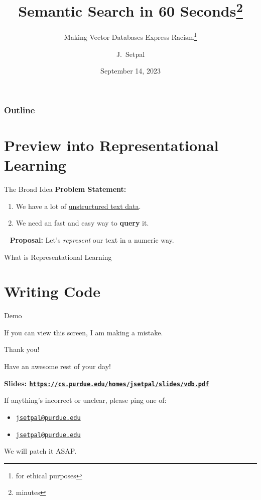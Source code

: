 \documentclass{beamer}
\title{Semantic Search in 60 Seconds\thanks{minutes}}
\subtitle{Making Vector Databases Express Racism\thanks{for ethical purposes}}
\author[ML@Purdue x Purdue Hackers] %
{J.~Setpal}
\date{September 14, 2023}
\begin{document}
\frame{\titlepage}


\begin{frame}
\frametitle{Outline}
\tableofcontents
\end{frame}

\section{Preview into Representational Learning}
\begin{frame}{The Broad Idea}
	\textbf{Problem Statement:} 
	\begin{enumerate}[label=\arabic*.]
		\item We have a lot of \underline{unstructured text data}. \pause
		\item We need an fast and easy way to \textbf{query} it.
	\end{enumerate}
	\ \newline
	\textbf{Proposal:} Let's \textit{represent} our text in a numeric way.
\end{frame}

\begin{frame}{What is Representational Learning}
\end{frame}

\section{Writing Code}
\begin{frame}{Demo}
	\begin{center}
		If you can view this screen, I am making a mistake.
	\end{center}
\end{frame}

\begin{frame}{Thank you!}
	\begin{center}
		Have an awesome rest of your day!
	\end{center}
	\begin{center}
		\bf \small Slides: \texttt{\url{https://cs.purdue.edu/homes/jsetpal/slides/vdb.pdf}}
	\end{center}
	\begin{center}
		If anything's incorrect or unclear, please ping one of:
		\begin{itemize} %
			\item[1.] \begin{center}\texttt{\href{mailto:jsetpal@purdue.edu}{jsetpal@purdue.edu}} \end{center}
			\item[2.] \begin{center}\texttt{\href{mailto:jsetpal@purdue.edu}{jsetpal@purdue.edu}} \end{center}
		\end{itemize}
		We will patch it ASAP.
	\end{center}
\end{frame}
\end{document}
